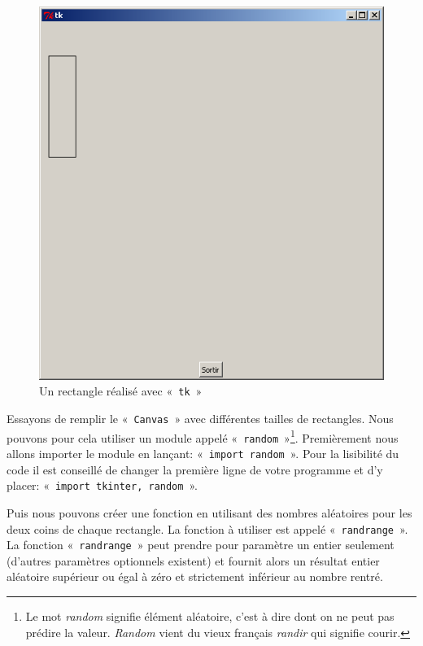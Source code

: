 \begin{figure}[h!]
\centering
\includegraphics[scale=0.4]{images/rectangle}
\caption{Un rectangle réalisé avec «~\texttt{tk}~»}\label{fig:rectangle}
\end{figure}
 
Essayons de remplir le «~\texttt{Canvas}~» avec différentes tailles de rectangles. Nous pouvons pour cela utiliser un module appelé «~\texttt{random}~»\footnote{Le mot \emph{random} signifie élément aléatoire, c'est à dire dont on ne peut pas prédire la valeur. \emph{Random} vient du vieux français \emph{randir} qui signifie courir.}. Premièrement nous allons importer le module en lançant: «~\texttt{import random}~». Pour la lisibilité du code il est conseillé de changer la première ligne de votre programme et d'y placer: «~\texttt{import tkinter, random}~».

Puis  nous pouvons créer une fonction en utilisant des nombres aléatoires pour les deux coins de chaque rectangle. La fonction à utiliser est appelé «~\texttt{randrange}~». La fonction «~\texttt{randrange}~» peut prendre pour paramètre un entier seulement (d'autres paramètres optionnels existent) et fournit alors un résultat entier aléatoire supérieur ou égal à zéro et strictement inférieur au nombre rentré.

